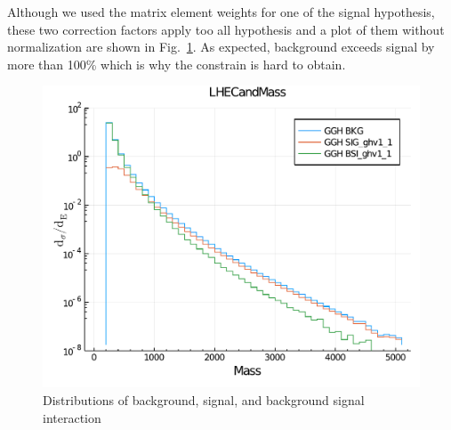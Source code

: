 Although we used the matrix element weights for one of the signal hypothesis, these two
correction factors apply too all hypothesis and a plot of them without normalization are shown
in Fig.~\ref{fig:bsi_sig_bkg_compare}. As expected, background exceeds signal by more than 100\%
which is why the constrain is hard to obtain.
\begin{figure}[htb]
    \begin{center}
        \includegraphics[width=.7\linewidth]{fig/LHE_integral_difference.pdf}
    \end{center}
    \caption{Distributions of background, signal, and background signal interaction}
    \label{fig:bsi_sig_bkg_compare}
\end{figure}


